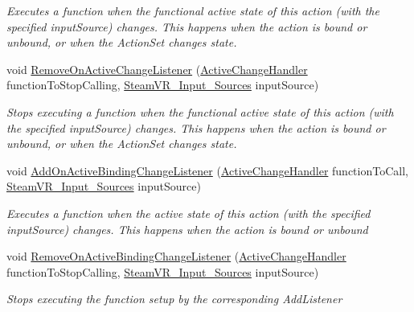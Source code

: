 \begin{DoxyCompactItemize}
\begin{DoxyCompactList}\small\item\em Executes a function when the {\itshape functional} active state of this action (with the specified input\+Source) changes. This happens when the action is bound or unbound, or when the Action\+Set changes state. \end{DoxyCompactList}\item 
void \mbox{\hyperlink{class_valve_1_1_v_r_1_1_steam_v_r___action___vector2_a7cceff632cff0062c1a2018032e84600}{Remove\+On\+Active\+Change\+Listener}} (\mbox{\hyperlink{class_valve_1_1_v_r_1_1_steam_v_r___action___vector2_ad01c83284de71c0d9cd8f7e673ce5ab5}{Active\+Change\+Handler}} function\+To\+Stop\+Calling, \mbox{\hyperlink{namespace_valve_1_1_v_r_a82e5bf501cc3aa155444ee3f0662853f}{Steam\+V\+R\+\_\+\+Input\+\_\+\+Sources}} input\+Source)
\begin{DoxyCompactList}\small\item\em Stops executing a function when the {\itshape functional} active state of this action (with the specified input\+Source) changes. This happens when the action is bound or unbound, or when the Action\+Set changes state. \end{DoxyCompactList}\item 
void \mbox{\hyperlink{class_valve_1_1_v_r_1_1_steam_v_r___action___vector2_a9ad74daee25b567d8961cd28d5357008}{Add\+On\+Active\+Binding\+Change\+Listener}} (\mbox{\hyperlink{class_valve_1_1_v_r_1_1_steam_v_r___action___vector2_ad01c83284de71c0d9cd8f7e673ce5ab5}{Active\+Change\+Handler}} function\+To\+Call, \mbox{\hyperlink{namespace_valve_1_1_v_r_a82e5bf501cc3aa155444ee3f0662853f}{Steam\+V\+R\+\_\+\+Input\+\_\+\+Sources}} input\+Source)
\begin{DoxyCompactList}\small\item\em Executes a function when the active state of this action (with the specified input\+Source) changes. This happens when the action is bound or unbound \end{DoxyCompactList}\item 
void \mbox{\hyperlink{class_valve_1_1_v_r_1_1_steam_v_r___action___vector2_a7ceb21535842b499cd8e73ffbee4be90}{Remove\+On\+Active\+Binding\+Change\+Listener}} (\mbox{\hyperlink{class_valve_1_1_v_r_1_1_steam_v_r___action___vector2_ad01c83284de71c0d9cd8f7e673ce5ab5}{Active\+Change\+Handler}} function\+To\+Stop\+Calling, \mbox{\hyperlink{namespace_valve_1_1_v_r_a82e5bf501cc3aa155444ee3f0662853f}{Steam\+V\+R\+\_\+\+Input\+\_\+\+Sources}} input\+Source)
\begin{DoxyCompactList}\small\item\em Stops executing the function setup by the corresponding Add\+Listener \end{DoxyCompactList}\item 

\end{DoxyCompactItemize}
